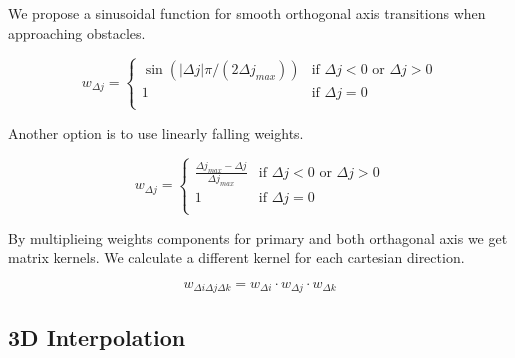 \documentclass[letterpaper, 10 pt, conference]{ieeeconf}  %
\begin{document}
%

We propose a sinusoidal function for smooth orthogonal axis transitions when approaching obstacles.

\begin{equation}
	w_{\Delta j} =
	\begin{cases} 
		\sin(\left| \Delta j \right| \pi / (2 \Delta j_{max})) & \text{if } \Delta j < 0 \text{~or }  \Delta j > 0 \\
		1 & \text{if } \Delta j = 0 \\
	\end{cases}
\end{equation}

Another option is to use linearly falling weights.

\begin{equation}
	w_{\Delta j} =
	\begin{cases} 
		\frac{\Delta j_{max} - \Delta j }{\Delta j_{max}} & \text{if } \Delta j < 0 \text{~or }  \Delta j > 0 \\
		1 & \text{if } \Delta j = 0 \\
	\end{cases}
\end{equation}


By multiplieing weights components for primary and both orthagonal axis we get matrix kernels. We calculate a different kernel for each cartesian direction.

\begin{equation}
	w_{\Delta i \Delta j \Delta k} = w_{\Delta i} \cdot w_{\Delta j} \cdot w_{\Delta k}
\end{equation}

\subsection{3D Interpolation} 
\end{document}
